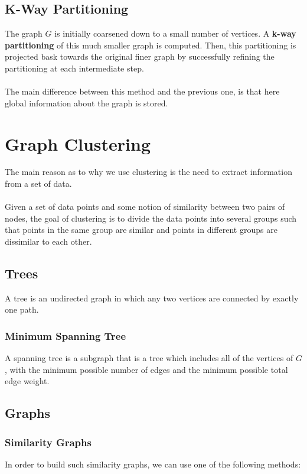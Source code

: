 \documentclass{article}
\begin{document}
\subsection{K-Way Partitioning}
The graph $G$ is initially coarsened down to a small number of vertices. A \textbf{k-way partitioning} of this much smaller graph is computed. Then, this partitioning is projected bask towards the original finer graph by successfully refining the partitioning at each intermediate step. \\ \\
The main difference between this method and the previous one, is that here global information about the graph is stored.

\section{Graph Clustering}
The main reason as to why we use clustering is the need to extract information from a set of data. \\ \\
Given a set of data points and some notion of similarity between two pairs of nodes, the goal of clustering is to divide the data points into several groups such that points in the same group are similar and points in different groups are dissimilar to each other.

\subsection{Trees}
A tree is an undirected graph in which any two vertices are connected by exactly one path.

\subsubsection{Minimum Spanning Tree}
A spanning tree is a subgraph that is a tree which includes all of the vertices of $G$, with the minimum possible number of edges and the minimum possible total edge weight.

\subsection{Graphs}
\subsubsection{Similarity Graphs}
In order to build such similarity graphs, we can use one of the following methods:
\end{document}
